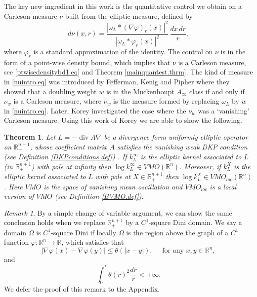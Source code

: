 \documentclass[11pt, a4paper,leqno]{amsart}
\theoremstyle{plain}
\newtheorem{theorem}[equation]{Theorem}
\theoremstyle{definition}
\theoremstyle{remark}
\newtheorem{remark}[equation]{Remark}
\numberwithin{equation}{section}
\newcommand{\RR}{{\mathbb{R}}}
\newcommand{\rn}{\mathbb{R}^n}
\newcommand{\ree}{\mathbb{R}^{n+1}}
\newcommand{\hm}{\omega}
\def\div{\mathop{\operatorname{div}}\nolimits}
\begin{document}
The key new ingredient in this work is the quantitative control we obtain on a Carleson measure $\nu$ built from the elliptic measure, defined by
\begin{equation}\label{nuintro.eq}
d\nu(x,r) = \frac{|\hm_L \ast (\nabla \varphi)_r(x)|^2}{|\hm_L \ast \varphi_r(x)|^2}  \, \frac{dx \, dr}{r},
\end{equation}
where $\varphi_r$ is a standard approximation of the identity. The control on $\nu$ is in the form of a point-wise density bound, which implies that $\nu$ is a Carleson measure, see \eqref{ptwisedensitybd1.eq} and Theorem \ref{mainquantest.thrm}. The kind of measure in \eqref{nuintro.eq} was introduced by Fefferman, Kenig and Pipher \cite{FKP} where they showed that a doubling weight $w$ is in the Muckenhoupt $A_\infty$ class if and only if $\nu_w$ is a Carleson measure, where $\nu_w$ is the measure formed by replacing $\hm_L$ by $w$ in \eqref{nuintro.eq}. Later, Korey \cite{Kor} investigated the case where the $\nu_w$ was a `vanishing' Carleson measure. Using this work of Korey we are able to show the following.
\begin{theorem}\label{mainvmo.thrm}
Let $L = -\div A\nabla$ be a divergence form uniformly elliptic operator on $\ree_+$, whose coefficient matrix $A$ satisfies the vanishing weak DKP condition (see Definition \ref{DKPconditions.def}) . If $k^\infty_L$ is the elliptic kernel associated to $L$ (in $\ree_+$) with pole at infinity then $\log k_L^\infty \in VMO(\rn)$. Moreover, if $k^X_L$ is the elliptic kernel associated to $L$ with pole at $X \in \ree_+$ then $\log k^X_L \in VMO_{loc}(\rn)$. Here $VMO$ is the space of vanishing mean oscillation and $VMO_{loc}$ is a local version of $VMO$ (see Definition \ref{BVMO.def}).
\end{theorem}
\begin{remark}
	By a simple change of variable argument, we can show the same conclusion holds when we replace $\ree_+$ by a $C^1$-square Dini domain. We say a domain $\Omega$ is $C^1$-square Dini if locally $\Omega$ is the region above the graph of a $C^1$ function $\varphi: \rn \to \RR$, which satisfies that
	\begin{equation}\label{eq:moc}
		|\nabla \varphi(x) - \nabla \varphi(y)| \leq \theta(|x-y|), \quad \text{ for any } x, y \in \RR^n, 
	\end{equation} 
	and
	\begin{equation}\label{def:squareDini}
		\int_0^* \theta(r)^2 \frac{dr}{r} < +\infty. 
	\end{equation} 
	We defer the proof of this remark to the Appendix.
\end{remark}
\end{document}
